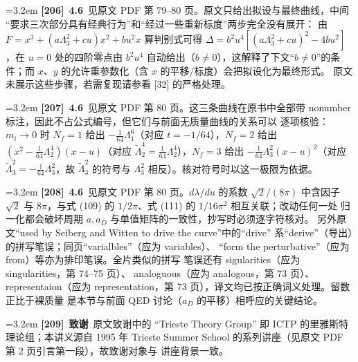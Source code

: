 \par
\par\medskip\noindent\hangindent=3.2em \textbf{[206]}~\textbf{4.6}~见原文 PDF 第 79--80 页。原文只给出拟设与最终曲线，中间 “要求三次部分具有经典行为”和“经过一些重新标度”两步完全没有展开： 由 $F=x^3+(a\Lambda_3^2+cu)x^2+bu^2x$ 算判别式可得 $\Delta=b^2u^4[(a\Lambda_3^2+cu)^2-4bu^2]$，在 $u=0$ 处的四阶零点由 $b^2u^4$ 自动给出（$b\ne0$），这解释了下文“$b\not=0$”的条件；而 $x$、$y$ 的允许重参数化（含 $x$ 的平移/标度）会把拟设化为最终形式。 原文未展示这些步骤，若需复现请参看 [32] 的严格处理。
\par
\par\medskip\noindent\hangindent=3.2em \textbf{[207]}~\textbf{4.6}~见原文 PDF 第 80 页。这三条曲线在原书中全部带 nonumber 标注，因此不占公式编号，但它们与前面无质量曲线的关系可以 逐项核验：$m_i\to0$ 时 $N_f=1$ 给出 $-\frac1{64}\Lambda_1^6$（对应 $t=-1/64$），$N_f=2$ 给出 $(x^2-\frac1{64}\Lambda_2^4)(x-u)$（对应 $\tilde\Lambda_2^4=\frac1{64}\Lambda_2^4$），$N_f=3$ 给出 $-\frac1{64}\Lambda_3^2(x-u)^2$（对应 $\tilde\Lambda_3^2=-\frac1{64}\Lambda_3^2$，故 $\tilde\Lambda_3^2$ 的符号与 $\Lambda_3^2$ 相反）。核对符号时以这一极限为依据。
\par
\par\medskip\noindent\hangindent=3.2em \textbf{[208]}~\textbf{4.6}~见原文 PDF 第 80 页。$d\lambda/du$ 的系数 $\sqrt2/(8\pi)$ 中含因子 $\sqrt2$ 与 $8\pi$，与式 (109) 的 $1/2\pi$、式 (111) 的 $1/16\pi^2$ 相互关联；改动任何一处 归一化都会破坏周期 $a,a_D$ 与单值矩阵的一致性，抄写时必须逐字符核对。 另外原文“used by Seiberg and Witten to drive the curve”中的“drive” 系“derive”（导出）的拼写笔误；同页“varialbles”（应为 variables）、 “form the perturbative”（应为 from）等亦为排印笔误。全片类似的拼写 笔误还有 sigularities（应为 singularities，第 74--75 页）、 analoguous（应为 analogous，第 73 页）、representaion（应为 representation，第 73 页），译文均已按正确词义处理。留数正比于裸质量 是本节与前面 QED 讨论（$a_D$ 的平移）相呼应的关键结论。
\par
\par\medskip\noindent\hangindent=3.2em \textbf{[209]}~\textbf{致谢}~原文致谢中的 “Trieste Theory Group” 即 ICTP 的里雅斯特理论组；本讲义源自 1995 年 Trieste Summer School 的系列讲座（见原文 PDF 第 2 页引言第一段），故致谢对象与 讲座背景一致。
\par
